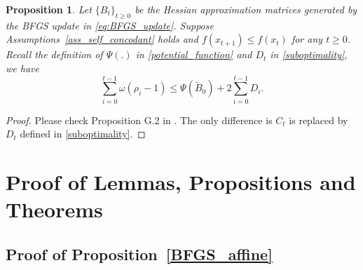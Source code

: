 \documentclass[11pt,letterpaper]{article}
\newcommand\0{{\Vector{0}}}
\newcommand\1{{\Vector{1}}}
\newtheorem{proposition}[theorem]{Proposition}
\numberwithin{assumption}{section}
\numberwithin{definition}{section}
\numberwithin{theorem}{section}
\numberwithin{remark}{section}
\begin{document}
\begin{proposition}\label{lemma_BFGS_superlinear}
Let $\{{B}_t\}_{t\geq 0}$ be the Hessian approximation matrices generated by the BFGS update in \eqref{eq:BFGS_update}. Suppose Assumptions~\ref{ass_self_concodant} holds and $f(x_{t + 1}) \leq f(x_t)$ for any $t \geq 0$. Recall the definition of $\Psi(.)$ in \eqref{potential_function} and $D_t$ in \eqref{suboptimality}, we have
\begin{equation}\label{eq:omega}
    \sum_{i = 0}^{t - 1} \omega(\rho_i - 1) \leq  \Psi(\tilde{B}_{0}) + 2\sum_{i = 0}^{t - 1}D_i.
\end{equation}
\end{proposition}

\begin{proof}
    Please check Proposition G.2 in \cite{qiujiang2024quasinewton}. The only difference is $C_t$ is replaced by $D_t$ defined in \eqref{suboptimality}.
\end{proof}

\section{Proof of Lemmas, Propositions and Theorems}

\subsection{Proof of Proposition~\ref{BFGS_affine}}\label{proof_affine}
\end{document}

